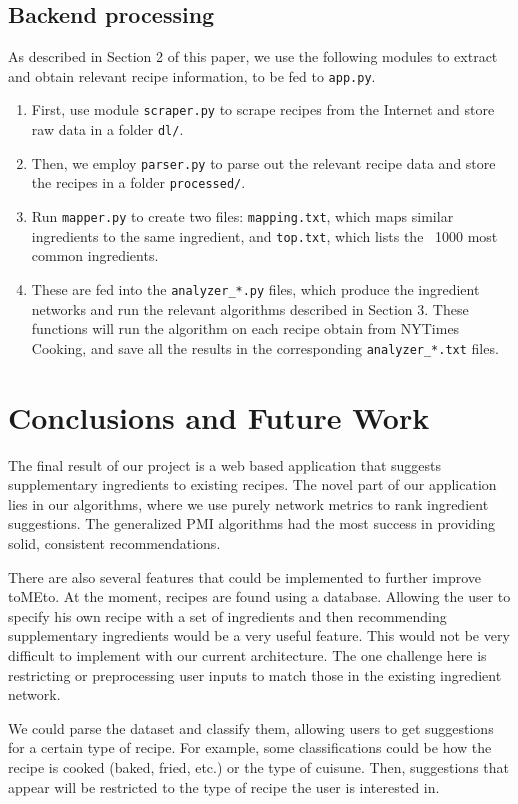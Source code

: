 \documentclass{acm_proc_article-sp}
\begin{document}
\subsection{Backend processing}
As described in Section 2 of this paper, we use the following
modules to extract and obtain relevant recipe information, to be fed to \texttt{app.py}.
\begin{enumerate}
	\item First, use module \texttt{scraper.py} to scrape recipes from the Internet
and store raw data in a folder \texttt{dl/}. 
	\item Then, we employ \texttt{parser.py} to parse out the relevant recipe data and store the recipes in a folder \texttt{processed/}. 
	\item Run \texttt{mapper.py} to create two files: \texttt{mapping.txt}, which maps
		similar ingredients to the same ingredient, and \texttt{top.txt}, which lists
		the ~1000 most common ingredients.
	\item These are fed into the \texttt{analyzer\_*.py} files, which produce the ingredient networks
		and run the relevant algorithms described in Section 3. These functions will run
		the algorithm on each recipe obtain from NYTimes Cooking, and save all the results 
		in the corresponding \texttt{analyzer\_*.txt} files.
\end{enumerate}

\section{Conclusions and Future Work}

The final result of our project is a web based application that suggests supplementary ingredients to existing recipes. The novel part of our application lies in our algorithms, where we use purely network metrics to rank ingredient suggestions. The generalized PMI algorithms had the most success in providing solid, consistent recommendations.

There are also several features that could be implemented to further improve toMEto. At the moment, recipes are found using a database. Allowing the user to specify his own recipe with a set of ingredients and then recommending supplementary ingredients would be a very useful feature. This would not be very difficult to implement with our current architecture. The one challenge here is restricting or preprocessing user inputs to match those in the existing ingredient network.

We could parse the dataset and classify them, allowing users to get suggestions for a certain type of recipe. For example, some classifications could be how the recipe is cooked (baked, fried, etc.) or the type of cuisune. Then, suggestions that appear will be restricted to the type of recipe the user is interested in.
\end{document}
